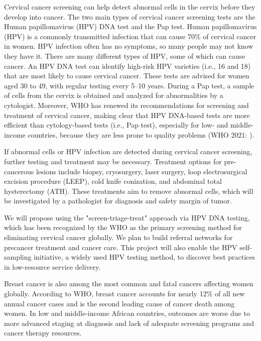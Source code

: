 \documentclass{article}
\begin{document}
Cervical cancer screening can help detect abnormal cells in the cervix before they develop into cancer. The two main types of cervical cancer screening tests are the Human papillomavirus (HPV) DNA test and the Pap test.
Human papillomavirus (HPV) is a commonly transmitted infection that can cause 70\% of cervical cancer in women. HPV infection often has no symptoms, so many people may not know they have it. There are many different types of HPV, some of which can cause cancer.
An HPV DNA test can identify high-risk HPV varieties (i.e., 16 and 18) that are most likely to cause cervical cancer.
These tests are advised for women aged 30 to 49, with regular testing every 5–10 years.
During a Pap test, a sample of cells from the cervix is obtained and analyzed for abnormalities by a cytologist.
Moreover, WHO has renewed its recommendations for screening and treatment of cervical cancer, making clear that HPV DNA-based tests are more efficient than cytology-based tests (i.e., Pap test), especially for low- and middle-income countries, because they are less prone to quality problems (WHO 2021: ).


If abnormal cells or HPV infection are detected during cervical cancer screening, further testing and treatment may be necessary. Treatment options for pre-cancerous lesions include biopsy, cryosurgery, laser surgery, loop electrosurgical excision procedure (LEEP), cold knife conization, and abdominal total hysterectomy (ATH). These treatments aim to remove abnormal cells, which will be investigated by a pathologist for diagnosis and safety margin of tumor.

We will propose using the "screen-triage-treat" approach via HPV DNA testing, which has been recognized by the WHO as the primary screening method for eliminating cervical cancer globally.
We plan to build referral networks for precancer treatment and cancer care.
This project will also enable the HPV self-sampling initiative, a widely used HPV testing method, to discover best practices in low-resource service delivery.


Breast cancer is also among the most common and fatal cancers affecting women globally. According to WHO, breast cancer accounts for nearly 12\% of all new annual cancer cases and is the second leading cause of cancer death among women. In low and middle-income African countries, outcomes are worse due to more advanced staging at diagnosis and lack of adequate screening programs and cancer therapy resources. 
\end{document}
